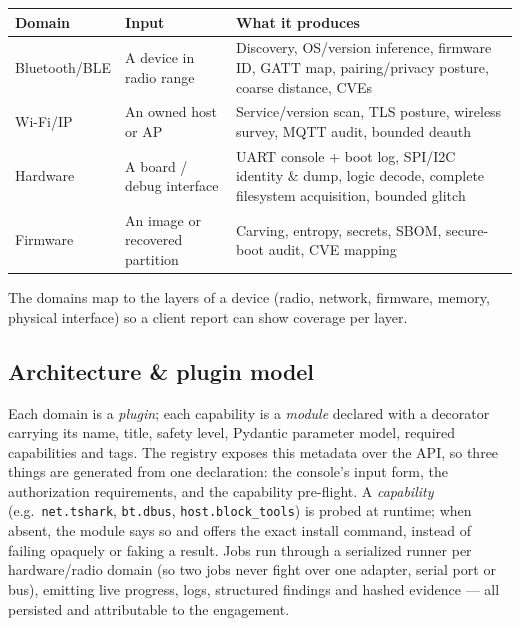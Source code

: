 \documentclass[11pt]{article}
\newif\ifintable\intablefalse
\newcommand{\code}[1]{\ifintable\texttt{#1}\else{\small\colorbox{codebg}{\texttt{#1}}}\fi}
\begin{document}
\begin{table}[h]
\centering\footnotesize\intabletrue
\begin{tabularx}{\textwidth}{@{}L{3.1cm} L{4.2cm} X@{}}
\toprule
\textbf{Domain} & \textbf{Input} & \textbf{What it produces}\\
\midrule
Bluetooth/BLE & A device in radio range & Discovery, OS/version inference, firmware ID, GATT map, pairing/privacy posture, coarse distance, CVEs\\
Wi-Fi/IP & An owned host or AP & Service/version scan, TLS posture, wireless survey, MQTT audit, bounded deauth\\
Hardware & A board / debug interface & UART console + boot log, SPI/I2C identity \& dump, logic decode, complete filesystem acquisition, bounded glitch\\
Firmware & An image or recovered partition & Carving, entropy, secrets, SBOM, secure-boot audit, CVE mapping\\
\bottomrule
\end{tabularx}
\end{table}

The domains map to the layers of a device (radio, network, firmware, memory,
physical interface) so a client report can show coverage per layer.

\subsection{Architecture \& plugin model}
Each domain is a \emph{plugin}; each capability is a \emph{module} declared with
a decorator carrying its name, title, safety level, Pydantic parameter model,
required capabilities and tags. The registry exposes this metadata over the API,
so three things are generated from one declaration: the console's input form, the
authorization requirements, and the capability pre-flight. A \emph{capability}
(e.g.\ \code{net.tshark}, \code{bt.dbus}, \code{host.block\_tools}) is probed at
runtime; when absent, the module says so and offers the exact install command,
instead of failing opaquely or faking a result. Jobs run through a serialized
runner per hardware/radio domain (so two jobs never fight over one adapter,
serial port or bus), emitting live progress, logs, structured findings and
hashed evidence --- all persisted and attributable to the engagement.
\end{document}
